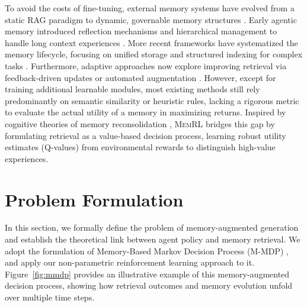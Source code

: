 \documentclass{article}
\theoremstyle{plain}
\theoremstyle{definition}
\theoremstyle{remark}
\begin{document}
To avoid the costs of fine-tuning, external memory systems have evolved from a static RAG paradigm to dynamic, governable memory structures  \citep{lewis2020retrieval,karpukhin2020dense}. Early agentic memory introduced reflection mechanisms and hierarchical management to handle long context experiences \citep{shinn2023reflexion,packer2024memgptllmsoperatingsystems}. More recent frameworks have systematized the memory lifecycle, focusing on unified storage and structured indexing for complex tasks  \citep{li2025memos,xu2025mem,huang2025licomemory,ye2025task}. Furthermore, adaptive approaches now explore improving retrieval via feedback-driven updates or automated augmentation  \citep{salama2025meminsight,zhang2025learn,li2025retrieval,zhou2025memento}. However, except for training additional learnable modules, most existing methods still rely predominantly on semantic similarity or heuristic rules, lacking a rigorous metric to evaluate the actual utility of a memory in maximizing returns. Inspired by cognitive theories of memory reconsolidation  \citep{schacter2007constructive,gick1980analogical,nader2000fear}, \textsc{MemRL} bridges this gap by formulating retrieval as a value-based decision process, learning robust utility estimates (Q-values) from environmental rewards to distinguish high-value experiences.


\section{Problem Formulation}
\label{sec:problem}

In this section, we formally define the problem of memory-augmented generation and establish the theoretical link between agent policy and memory retrieval. We adopt the formulation of Memory-Based Markov Decision Process (M-MDP)  \citep{zhou2025memento}, and apply our non-parametric reinforcement learning approach to it.
Figure~\ref{fig:mmdp} provides an illustrative example of this memory-augmented decision process, showing how retrieval outcomes and memory evolution unfold over multiple time steps.


\end{document}
